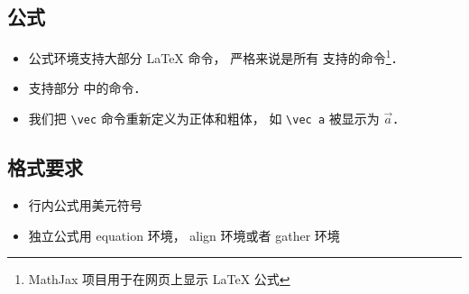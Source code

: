 \subsection{公式}
\begin{itemize}
\item 公式环境支持大部分 LaTeX 命令， 严格来说是所有  支持的命令\footnote{MathJax 项目用于在网页上显示 LaTeX 公式}．
\item 支持部分 中的命令．
\item 我们把 \lstinline|\vec| 命令重新定义为正体和粗体， 如 \lstinline|\vec a| 被显示为 $\vec a$．
\end{itemize}

\subsection{格式要求}

\begin{itemize}
\item 行内公式用美元符号
\item 独立公式用 equation 环境， align 环境或者 gather 环境
\end{itemize}
